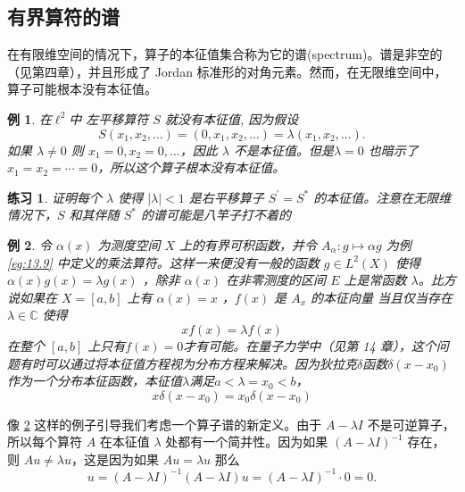 \documentclass[hyperref,UTF8]{ctexbook}
\newtheorem{eg}{例}[chapter]
\newtheorem*{exercise}{练习}
\begin{document}
\subsection{有界算符的谱}
在有限维空间的情况下，算子的本征值集合称为它的谱(spectrum)。谱是非空的（见第四章），并且形成了 Jordan 标准形的对角元素。然而，在无限维空间中，算子可能根本没有本征值。
\begin{eg}
在\(\ell^{2}\)中 左平移算符 \(S\) 就没有本征值, 因为假设
\[
S\left(x_{1}, x_{2}, \ldots\right)=\left(0, x_{1}, x_{2}, \ldots\right)=\lambda\left(x_{1}, x_{2}, \ldots\right) .
\]
如果 \(\lambda \neq 0\) 则 \(x_{1}=0, x_{2}=0, \ldots\)，因此 \(\lambda\) 不是本征值。但是\(\lambda=0\) 也暗示了\(x_{1}=x_{2}=\cdots=0\)，所以这个算子根本没有本征值。
\end{eg}
\begin{exercise}
    证明每个 \(\lambda\) 使得 \(|\lambda|<1\) 是右平移算子 \(S^{\prime}=S^{*}\) 的本征值。注意在无限维情况下，\(S\) 和其伴随 \(S^{*}\) 的谱可能是八竿子打不着的
\end{exercise}
\begin{eg}\label{eg:13.14}
   令 \(\alpha(x)\) 为测度空间 \(X\) 上的有界可积函数，并令 \(A_{\alpha}: g \mapsto \alpha g\) 为例 \ref{eg:13.9} 中定义的乘法算符。这样一来便没有一般的函数 \(g \in L^{2}(X)\) 使得 \(\alpha(x) g(x)=\lambda g(x)\) ，除非 \(\alpha(x) \) 在非零测度的区间 \(E\) 上是常函数 \(\lambda\)。比方说如果在 \(X=[a, b]\) 上有 \(\alpha(x)=x\) ，\(f(x)\) 是 \(A_{x}\) 的本征向量 当且仅当存在 \(\lambda \in \mathbb{C}\) 使得
\[
x f(x)=\lambda f(x)
\]
在整个 \([a, b]\) 上只有\(f(x)=0\)才有可能。在量子力学中（见第 14 章），这个问题有时可以通过将本征值方程视为分布方程来解决。因为狄拉克\(\delta\)函数\(\delta\left(x-x_{0}\right)\)作为一个分布本征函数，本征值\(\lambda\)满足\(a<\lambda=x_{0}<b\)，
\[
x \delta\left(x-x_{0}\right)=x_{0} \delta\left(x-x_{0}\right)
\]
\end{eg}

像 \ref{eg:13.14} 这样的例子引导我们考虑一个算子谱的新定义。由于 \(A-\lambda I\) 不是可逆算子，所以每个算符 \(A\) 在本征值 \(\lambda\) 处都有一个简并性。因为如果 \((A-\lambda I)^{-1}\) 存在，则 \(A u \neq \lambda u\)，这是因为如果 \(A u=\lambda u\) 那么
\[
u=(A-\lambda I)^{-1}(A-\lambda I) u=(A-\lambda I)^{-1}\cdot 0=0 .
\]
\end{document}
